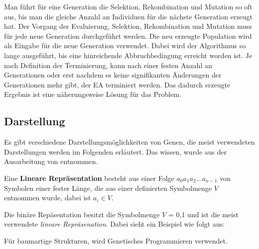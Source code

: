 Man f{\"u}hrt f{\"u}r eine Generation die Selektion, Rekombination und Mutation so oft aus, bis man die gleiche Anzahl an Individuen f{\"u}r die n{\"a}chste Generation erzeugt hat.
Der Vorgang der Evaluierung, Selektion, Rekombination und Mutation muss f{\"u}r jede neue Generation durchgef{\"u}hrt werden. 
Die neu erzeugte Population wird als Eingabe f{\"u}r die neue Generation verwendet. 
Dabei wird der Algorithmus so lange ausgef{\"u}hrt, bis eine hinreichende Abbruchbedingung erreicht worden ist. 
Je nach Definition der Terminierung, kann nach einer festen Anzahl an Generationen oder erst nachdem es keine signifikanten {\"A}nderungen der Generationen mehr gibt, der EA terminiert werden.
Das dadurch erzeugte Ergebnis ist eine n{\"a}herungsweise L{\"o}sung f{\"u}r das Problem.

\subsection{Darstellung}
Es gibt verschiedene Darstellungsm{\"o}glichkeiten von Genen, die meist verwendeten Darstellungen werden im Folgenden erläutert. Das wissen, wurde aus der Ausarbeitung von \cite{flickevolutionare, shiffman2012nature, DillmannZoeller2017} entnommen.

Eine \textbf{Lineare Repr{\"a}sentation} besteht aus einer Folge $a_{0}a_{1}a_{2}...a_{n-1}$ von Symbolen einer fester L{\"a}nge, die aus einer definierten Symbolmenge $V$ entnommen wurde, dabei ist $a_{i} \in V$.   

Die bin{\"a}re Rep{\"a}sentation besitzt die Symbolmenge $V$ = {0,1} und ist die meist verwendete \textit{lineare Repr{\"a}senation}. Dabei sieht ein Beispiel wie folgt aus:

F{\"u}r baumartige Strukturen, wird Genetisches Programmieren verwendet.









